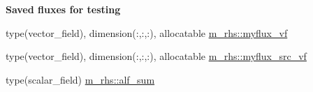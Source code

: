 \begin{Indent}\textbf{ Saved fluxes for testing}\par
\begin{DoxyCompactItemize}
\item 
type(vector\+\_\+field), dimension(\+:,\+:,\+:), allocatable \hyperlink{namespacem__rhs_a32b605d9d7c6a2dd06b13df3beb0b4ce}{m\+\_\+rhs\+::myflux\+\_\+vf}
\item 
type(vector\+\_\+field), dimension(\+:,\+:,\+:), allocatable \hyperlink{namespacem__rhs_affa0b502273a1db4307c4c7d36a088e7}{m\+\_\+rhs\+::myflux\+\_\+src\+\_\+vf}
\item 
type(scalar\+\_\+field) \hyperlink{namespacem__rhs_aaaecb99341e4534ec839e9356bf90536}{m\+\_\+rhs\+::alf\+\_\+sum}
\end{DoxyCompactItemize}
\end{Indent}
